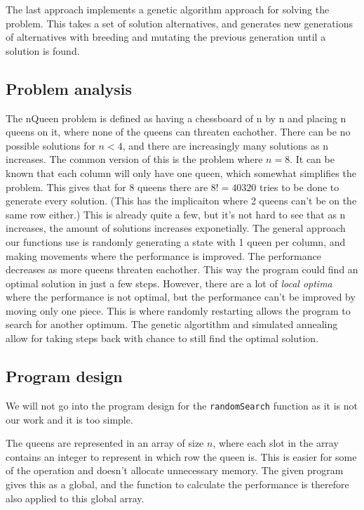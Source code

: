 \documentclass{article}
\begin{document}
The last approach implements a genetic algorithm approach for solving the problem. This takes a set of solution alternatives, and generates new generations of alternatives with breeding and mutating the previous generation until a solution is found.
\subsection*{Problem analysis}

The nQueen problem is defined as having a chessboard of n by n and placing n queens on it, where none of the queens can threaten eachother. There can be no possible solutions for $n<4$, and there are increasingly many solutions as n increases. The common version of this is the problem where $n=8$. It can be known that each column will only have one queen, which somewhat simplifies the problem. This gives that for 8 queens there are $8! = 40320$ tries to be done to generate every solution. (This has the implicaiton where 2 queens can't be on the same row either.) This is already quite a few, but it's not hard to see that as n increases, the amount of solutions increases exponetially. The general approach our functions use is randomly generating a state with 1 queen per column, and making movements where the performance is improved. The performance decreases as more queens threaten eachother. This way the program could find an optimal solution in just a few steps. However, there are a lot of \textit{local optima} where the performance is not optimal, but the performance can't be improved by moving only one piece. This is where randomly restarting allows the program to search for another optimum. The genetic algortithm and simulated annealing allow for taking steps back with chance to still find the optimal solution. 

\subsection*{Program design}
We will not go into the program design for the \verb!randomSearch! function as it is not our work and it is too simple.

The queens are represented in an array of size $n$, where each slot in the array contains an integer to represent in which row the queen is. This is easier for some of the operation and doesn't allocate unnecessary memory. The given program gives this as a global, and the function to calculate the performance is therefore also applied to this global array.
\end{document}
